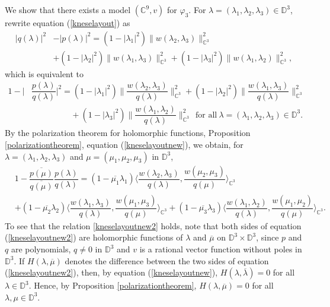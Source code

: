 \documentclass[11pt, reqno]{amsart}
\newcommand\1{\boldsymbol {1}}
\numberwithin{equation}{section}
\begin{document}
We show that there exists a model $(\mathbb{C}^{9},v)$ for $\varphi_3$. For $\lambda=(\lambda_{1},\lambda_{2},\lambda_{3})\in\mathbb{D}^{3}$, rewrite equation (\ref{kneselayout}) as 
\begin{align*}
    \lvert q(\lambda) \rvert^{2} &-\lvert p(\lambda)\rvert^{2}= (1-\lvert \lambda_{1}\rvert^{2})\|w(\lambda_{2},\lambda_{3})\|_{\mathbb{C}^{3}}^{2}\nonumber \\
    &+(1-\lvert \lambda_{2}\rvert^{2})\|w(\lambda_{1},\lambda_{3})\|_{\mathbb{C}^{3}}^{2}+(1-\lvert \lambda_{3}\rvert^{2})\|w(\lambda_{1},\lambda_{2})\|_{\mathbb{C}^{3}}^{2},
\end{align*}
which is equivalent to
\begin{align}
    1 -\bigg\lvert &\dfrac{p(\lambda)}{ q(\lambda)}\bigg\rvert^{2}= (1-\lvert \lambda_{1}\rvert^{2})\bigg\|\dfrac{w(\lambda_{2},\lambda_{3})}{q(\lambda)}\bigg\|_{\mathbb{C}^{3}}^{2}+(1-\lvert \lambda_{2}\rvert^{2})\bigg\|\dfrac{w(\lambda_{1},\lambda_{3})}{q(\lambda)}\bigg\|_{\mathbb{C}^{3}}^{2}\nonumber \\
    &\hspace{2cm}+(1-\lvert \lambda_{3}\rvert^{2})\bigg\|\dfrac{w(\lambda_{1},\lambda_{2})}{q(\lambda)}\bigg\|_{\mathbb{C}^{3}}^{2}~~\text{for all}~\lambda=(\lambda_{1},\lambda_{2},\lambda_{3})\in\mathbb{D}^{3}.\label{kneselayoutnew}
\end{align}
By the polarization theorem for holomorphic functions, Proposition \ref{polarizationtheorem}, equation (\ref{kneselayoutnew}), we obtain, for $\lambda=(\lambda_{1},\lambda_{2},\lambda_{3})$ and $\mu=(\mu_{1},\mu_{2},\mu_{3})$ in $\mathbb{D}^{3}$,
\begin{align}
    & 1 -\dfrac{\overline{p(\mu)}}{\overline{q(\mu)}}\dfrac{p(\lambda)}{ q(\lambda)}\nonumber = (1-\overline{\mu_{1}}\lambda_{1})\bigg\langle\dfrac{w(\lambda_{2},\lambda_{3})}{q(\lambda)},\dfrac{w(\mu_{2},\mu_{3})}{q(\mu)}\bigg\rangle_{\mathbb{C}^{3}}\\
    &+( 1-\overline{\mu_{2}}\lambda_{2})\bigg\langle\dfrac{w(\lambda_{1},\lambda_{3})}{q(\lambda)},\dfrac{w(\mu_{1},\mu_{3})}{q(\mu)}\bigg\rangle_{\mathbb{C}^{3}}+(1-\overline{\mu_{3}} \lambda_{3})\bigg\langle\dfrac{w(\lambda_{1},\lambda_{2})}{q(\lambda)},\dfrac{w(\mu_{1},\mu_{2})}{q(\mu)}\bigg\rangle_{\mathbb{C}^{3}}.\label{kneselayoutnew2}
\end{align}
To see that the relation \eqref{kneselayoutnew2} holds, note that both sides of equation (\ref{kneselayoutnew2}) are holomorphic functions of $\lambda$ and $\overline{\mu}$ on $\mathbb{D}^{3} \times \mathbb{D}^{3}$, since $p$ and $q$ are polynomials, $q\neq 0$ in $\mathbb{D}^{3}$ and $v$ is a rational vector function without poles in $\mathbb{D}^{3}$. If $H(\lambda,\overline{\mu})$ denotes the difference between the two sides of equation (\ref{kneselayoutnew2}), then, by equation (\ref{kneselayoutnew}), $H(\lambda,\overline{\lambda})=0$ for all $\lambda\in\mathbb{D}^{3}$. Hence, by Proposition \ref{polarizationtheorem}, $H(\lambda,\overline{\mu})=0$ for all $\lambda,\mu\in\mathbb{D}^{3}$.
\end{document}
